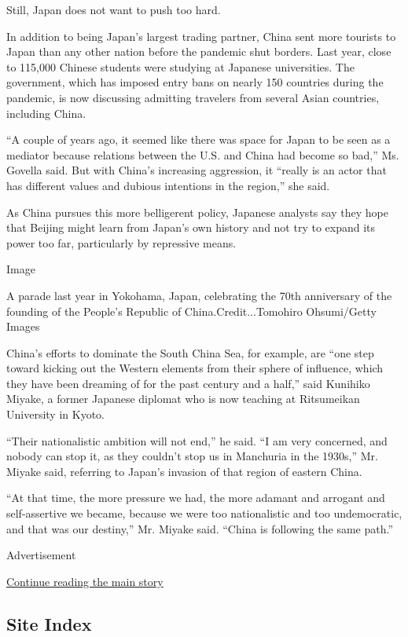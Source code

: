 Still, Japan does not want to push too hard.

In addition to being Japan's largest trading partner, China sent more
tourists to Japan than any other nation before the pandemic shut
borders. Last year, close to 115,000 Chinese students were studying at
Japanese universities. The government, which has imposed entry bans on
nearly 150 countries during the pandemic, is now discussing admitting
travelers from several Asian countries, including China.

``A couple of years ago, it seemed like there was space for Japan to be
seen as a mediator because relations between the U.S. and China had
become so bad,'' Ms. Govella said. But with China's increasing
aggression, it ``really is an actor that has different values and
dubious intentions in the region,'' she said.

As China pursues this more belligerent policy, Japanese analysts say
they hope that Beijing might learn from Japan's own history and not try
to expand its power too far, particularly by repressive means.

Image

A parade last year in Yokohama, Japan, celebrating the 70th anniversary
of the founding of the People's Republic of China.Credit...Tomohiro
Ohsumi/Getty Images

China's efforts to dominate the South China Sea, for example, are ``one
step toward kicking out the Western elements from their sphere of
influence, which they have been dreaming of for the past century and a
half,'' said Kunihiko Miyake, a former Japanese diplomat who is now
teaching at Ritsumeikan University in Kyoto.

``Their nationalistic ambition will not end,'' he said. ``I am very
concerned, and nobody can stop it, as they couldn't stop us in Manchuria
in the 1930s,'' Mr. Miyake said, referring to Japan's invasion of that
region of eastern China.

``At that time, the more pressure we had, the more adamant and arrogant
and self-assertive we became, because we were too nationalistic and too
undemocratic, and that was our destiny,'' Mr. Miyake said. ``China is
following the same path.''

Advertisement

\protect\hyperlink{after-bottom}{Continue reading the main story}

\hypertarget{site-index}{%
\subsection{Site Index}\label{site-index}}

